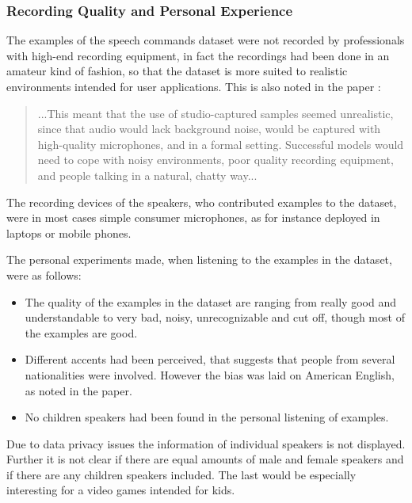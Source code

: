 \subsubsection{Recording Quality and Personal Experience}
The examples of the speech commands dataset \cite{Warden2018} were not recorded by professionals with high-end recording equipment, in fact the recordings had been done in an amateur kind of fashion, so that the dataset is more suited to realistic environments intended for user applications.
This is also noted in the paper \cite{Warden2018}:
\begin{quote}
...This meant that the use of studio-captured samples seemed unrealistic, since that audio would lack background noise, would be captured with high-quality microphones, and in a formal setting. 
Successful models would need to cope with noisy environments, poor quality recording equipment, and people talking in a natural, chatty way...
\end{quote}
The recording devices of the speakers, who contributed examples to the dataset, were in most cases simple consumer microphones, as for instance deployed in laptops or mobile phones.

The personal experiments made, when listening to the examples in the dataset, were as follows:
\begin{itemize}
  \item The quality of the examples in the dataset are ranging from really good and understandable to very bad, noisy, unrecognizable and cut off, though most of the examples are good.

  \item Different accents had been perceived, that suggests that people from several nationalities were involved. 
  However the bias was laid on American English, as noted in the paper.

  \item No children speakers had been found in the personal listening of examples.
\end{itemize}

Due to data privacy issues the information of individual speakers is not displayed.
Further it is not clear if there are equal amounts of male and female speakers and if there are any children speakers included.
The last would be especially interesting for a video games intended for kids.

